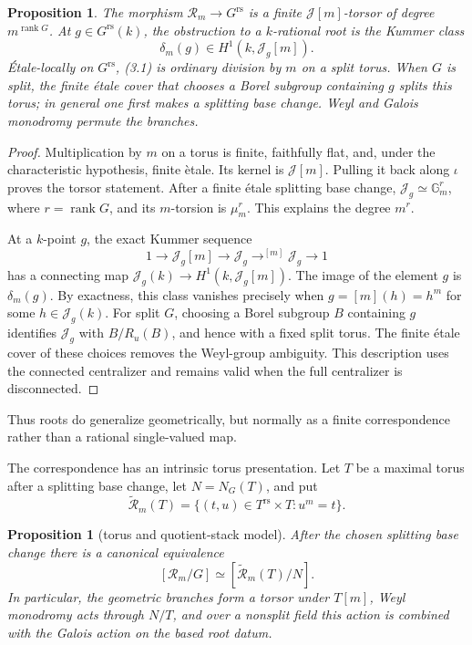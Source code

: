 \documentclass[11pt,reqno]{amsart}
\newtheorem{proposition}[theorem]{Proposition}
\theoremstyle{definition}
\theoremstyle{remark}
\newcommand{\Gm}{\mathbb G_m}
\newcommand{\cR}{\mathcal R}
\newcommand{\cJ}{\mathcal J}
\newcommand{\rs}{\mathrm{rs}}
\begin{document}
\begin{proposition}
The morphism \(\cR_m\to G^{\rs}\) is a finite \(\cJ[m]\)-torsor of degree
\(m^{\operatorname{rank}G}\).  At \(g\in G^{\rs}(k)\), the obstruction to a
\(k\)-rational root is the Kummer class
\[
 \delta_m(g)\in H^1(k,\cJ_g[m]).
\]
\'Etale-locally on \(G^{\rs}\), (3.1) is ordinary division by \(m\) on a
split torus.  When \(G\) is split, the finite \'etale cover that chooses a
Borel subgroup containing \(g\) splits this torus; in general one first
makes a splitting base change.  Weyl and Galois monodromy
permute the branches.
\end{proposition}

\begin{proof}
Multiplication by \(m\) on a torus is finite, faithfully flat, and, under the
characteristic hypothesis, finite \`etale.  Its kernel is \(\cJ[m]\).  Pulling it
back along \(\iota\) proves the torsor statement.  After a finite
\'etale splitting base change, \(\cJ_g\simeq\Gm^r\), where
\(r=\operatorname{rank}G\), and its \(m\)-torsion is
\(\mu_m^r\).  This explains the degree \(m^r\).

At a \(k\)-point \(g\), the exact Kummer sequence
\[
 1\longrightarrow\cJ_g[m]\longrightarrow\cJ_g
   \mathop{\longrightarrow}^{[m]}\cJ_g\longrightarrow1
\]
has a connecting map
\(\cJ_g(k)\to H^1(k,\cJ_g[m])\).  The image of the element \(g\) is
\(\delta_m(g)\).  By exactness, this class vanishes precisely when
\(g=[m](h)=h^m\) for some \(h\in\cJ_g(k)\).  For split \(G\), choosing a
Borel subgroup \(B\) containing \(g\) identifies \(\cJ_g\) with
\(B/R_u(B)\), and hence with a fixed split torus.  The finite \'etale
cover of these choices removes the Weyl-group ambiguity.  This description
uses the connected centralizer and remains valid when the full centralizer
is disconnected.
\end{proof}

Thus roots do generalize geometrically, but normally as a finite
correspondence rather than a rational single-valued map.

The correspondence has an intrinsic torus presentation.  Let \(T\) be a
maximal torus after a splitting base change, let \(N=N_G(T)\), and put
\[
 \widetilde{\cR}_m(T)=
 \{(t,u)\in T^{\rs}\times T:u^m=t\}.
\]

\begin{proposition}[torus and quotient-stack model]\label{prop:root-stack}
After the chosen splitting base change there is a canonical equivalence
\[
 [\cR_m/G]\simeq[\widetilde{\cR}_m(T)/N].
\tag{3.2}
\]
In particular, the geometric branches form a torsor under \(T[m]\), Weyl
monodromy acts through \(N/T\), and over a nonsplit field this action is
combined with the Galois action on the based root datum.
\end{proposition}
\end{document}
